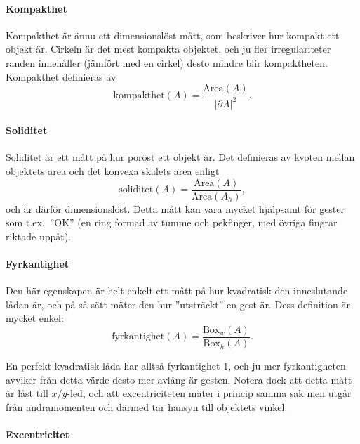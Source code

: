 \documentclass[../rapport_MVEX01-11-05]{subfiles}
\begin{document}
\paragraph{Kompakthet}

Kompakthet \cite[s.~26]{Rudemo09} är ännu ett dimensionslöst mått, som
beskriver hur kompakt ett objekt är.
Cirkeln är det mest kompakta objektet, och ju fler irregulariteter
randen innehåller (jämfört med en cirkel) desto mindre blir kompaktheten.
Kompakthet definieras av
\begin{equation*}
  \textrm{kompakthet}(A) = \frac{\textrm{Area}(A)}{\left|\partial
  A\right|^2}.
\end{equation*}

\paragraph{Soliditet}

Soliditet är ett mått på hur poröst ett objekt är. Det
definieras av kvoten mellan objektets area och det konvexa skalets
area enligt
\begin{equation*}
  \textrm{soliditet}(A) = \frac{\textrm{Area}(A)}{\textrm{Area}(A_h)},
\end{equation*}
och är därför dimensionslöst. Detta mått kan vara mycket hjälpsamt för
gester som t.ex.~''OK'' (en ring formad av tumme och pekfinger, med
övriga fingrar riktade uppåt).

\paragraph{Fyrkantighet}

Den här egenskapen är helt enkelt ett mått på hur kvadratisk den
inneslutande lådan är, och på så sätt mäter den hur ''utsträckt'' en
gest är. Dess definition är mycket enkel:
\begin{equation*}
  \textrm{fyrkantighet}(A) = \frac{\textrm{Box}_w(A)}{\textrm{Box}_h(A)}.
\end{equation*}

En perfekt kvadratisk låda har alltså fyrkantighet $1$, och ju mer
fyrkantigheten avviker från detta värde desto mer avlång är gesten.
Notera dock att detta mått är låst till $x/y$-led,
och att
excentriciteten mäter i princip samma sak men utgår från
andramomenten och därmed tar hänsyn till objektets vinkel.

\paragraph{Excentricitet}
\end{document}
